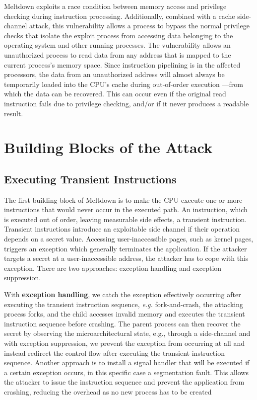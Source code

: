 \documentclass[runningheads]{llncs}
\begin{document}
Meltdown exploits a race condition between memory access and privilege checking during instruction processing. Additionally, combined with a cache side-channel attack, this vulnerability allows a process to bypass the normal privilege checks that isolate the exploit process from accessing data belonging to the operating system and other running processes. The vulnerability allows an unauthorized process to read data from any address that is mapped to the current process's memory space. Since instruction pipelining is in the affected processors, the data from an unauthorized address will almost always be temporarily loaded into the CPU's cache during out-of-order execution —from which the data can be recovered. This can occur even if the original read instruction fails due to privilege checking, and/or if it never produces a readable result.

\section{Building Blocks of the Attack}
\subsection{Executing Transient Instructions}
The first building block of Meltdown is to make the CPU execute one or more instructions that would never occur in the executed path. An instruction, which is executed out of order, leaving measurable side effects, a transient instruction. Transient instructions introduce an exploitable side channel if their operation depends on a secret value. Accessing user-inaccessible pages, such as kernel pages, triggers an exception which generally terminates the application. If the attacker targets a secret at a user-inaccessible address, the attacker has to cope with this exception. There are two approaches:  exception handling and exception suppression.

With \textbf{exception handling}, we catch the exception effectively occurring after executing the transient instruction sequence, \textit{e.g.}  fork-and-crash, the attacking process forks, and the child accesses invalid memory and executes the transient instruction sequence before crashing. The parent process can then recover the secret by observing the microarchitectural state, e.g., through a side-channel and with exception suppression, we prevent the exception from occurring at all and instead redirect the control flow after executing the transient instruction sequence. Another approach is to install a signal handler that will be executed if a certain exception occurs, in this specific case a segmentation fault. This allows the attacker to issue the instruction sequence and prevent the application from crashing, reducing the overhead as no new process has to be created
\end{document}

